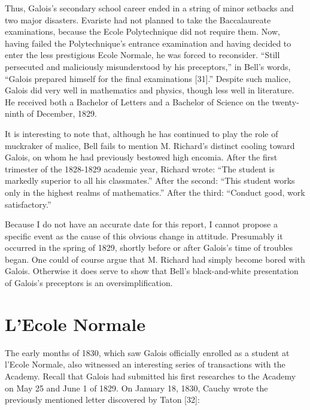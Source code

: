 \documentclass[12pt]{article}
\begin{document}
Thus, Galois's secondary school career ended in a string of minor setbacks and two major disasters. Evariste had not planned to take the Baccalaureate examinations, because the Ecole Polytechnique did not require them. Now, having failed the Polytechnique's entrance examination and having decided to enter the less prestigious Ecole Normale, he was forced to reconsider. ``Still persecuted and maliciously misunderstood by his preceptors,'' in Bell's words, ``Galois prepared himself for the final examinations [31].'' Despite such malice, Galois did very well in mathematics and physics, though less well in literature. He received both a Bachelor of Letters and a Bachelor of Science on the twenty-ninth of December, 1829.

It is interesting to note that, although he has continued to play the role of muckraker of malice, Bell fails to mention M. Richard's distinct cooling toward Galois, on whom he had previously bestowed high encomia. After the first trimester of the 1828-1829 academic year, Richard wrote: ``The student is markedly superior to all his classmates.'' After the second: ``This student works only in the highest realms of mathematics.'' After the third: ``Conduct good, work satisfactory.''

Because I do not have an accurate date for this report, I cannot propose a specific event as the cause of this obvious change in attitude. Presumably it occurred in the spring of 1829, shortly before or after Galois's time of troubles began. One could of course argue that M. Richard had simply become bored with Galois. Otherwise it does serve to show that Bell's black-and-white presentation of Galois's preceptors is an oversimplification.

\section{L'Ecole Normale}

The early months of 1830, which saw Galois officially enrolled as a student at l'Ecole Normale, also witnessed an interesting series of transactions with the Academy. Recall that Galois had submitted his first researches to the Academy on May 25 and June 1 of 1829. On January 18, 1830, Cauchy wrote the previously mentioned letter discovered by Taton [32]:
\end{document}
